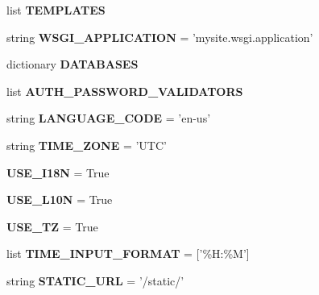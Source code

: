 \begin{DoxyCompactItemize}
\item 
list {\bfseries T\-E\-M\-P\-L\-A\-T\-E\-S}
\item 
\hypertarget{namespacemysite_1_1settings_a7e476bde6438ad8065a7d9f5b4a759ba}{string {\bfseries W\-S\-G\-I\-\_\-\-A\-P\-P\-L\-I\-C\-A\-T\-I\-O\-N} = 'mysite.\-wsgi.\-application'}\label{namespacemysite_1_1settings_a7e476bde6438ad8065a7d9f5b4a759ba}

\item 
dictionary {\bfseries D\-A\-T\-A\-B\-A\-S\-E\-S}
\item 
list {\bfseries A\-U\-T\-H\-\_\-\-P\-A\-S\-S\-W\-O\-R\-D\-\_\-\-V\-A\-L\-I\-D\-A\-T\-O\-R\-S}
\item 
\hypertarget{namespacemysite_1_1settings_a5aa2d89c65baaf7b41e64a82ed412029}{string {\bfseries L\-A\-N\-G\-U\-A\-G\-E\-\_\-\-C\-O\-D\-E} = 'en-\/us'}\label{namespacemysite_1_1settings_a5aa2d89c65baaf7b41e64a82ed412029}

\item 
\hypertarget{namespacemysite_1_1settings_a8166ffe52ad58ff798949b613c9b5b2c}{string {\bfseries T\-I\-M\-E\-\_\-\-Z\-O\-N\-E} = 'U\-T\-C'}\label{namespacemysite_1_1settings_a8166ffe52ad58ff798949b613c9b5b2c}

\item 
\hypertarget{namespacemysite_1_1settings_af3b43f8f116e73ded7f3ce336e7499ac}{{\bfseries U\-S\-E\-\_\-\-I18\-N} = True}\label{namespacemysite_1_1settings_af3b43f8f116e73ded7f3ce336e7499ac}

\item 
\hypertarget{namespacemysite_1_1settings_abaf7e237dddf19bbdecee0f0167c2e06}{{\bfseries U\-S\-E\-\_\-\-L10\-N} = True}\label{namespacemysite_1_1settings_abaf7e237dddf19bbdecee0f0167c2e06}

\item 
\hypertarget{namespacemysite_1_1settings_a58cd46ff574d992b401f49fd371e0b24}{{\bfseries U\-S\-E\-\_\-\-T\-Z} = True}\label{namespacemysite_1_1settings_a58cd46ff574d992b401f49fd371e0b24}

\item 
\hypertarget{namespacemysite_1_1settings_a27a17651ea0f9224d5af5cfe13a80591}{list {\bfseries T\-I\-M\-E\-\_\-\-I\-N\-P\-U\-T\-\_\-\-F\-O\-R\-M\-A\-T} = \mbox{[}'\%H\-:\%M'\mbox{]}}\label{namespacemysite_1_1settings_a27a17651ea0f9224d5af5cfe13a80591}

\item 
\hypertarget{namespacemysite_1_1settings_a2aa5b2f0ed54dd3f8965ca2786f7fc27}{string {\bfseries S\-T\-A\-T\-I\-C\-\_\-\-U\-R\-L} = '/static/'}\label{namespacemysite_1_1settings_a2aa5b2f0ed54dd3f8965ca2786f7fc27}


\end{DoxyCompactItemize}

